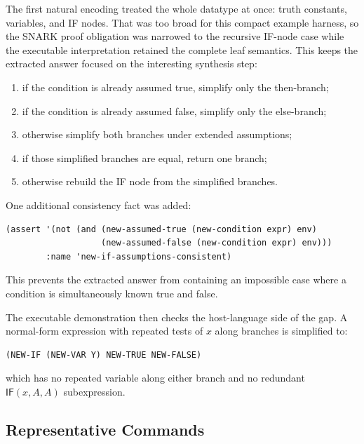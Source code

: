 \documentclass[runningheads]{llncs}
\begin{document}
The first natural encoding treated the whole datatype at once: truth constants,
variables, and IF nodes.  That was too broad for this compact example harness,
so the SNARK proof obligation was narrowed to the recursive IF-node case while
the executable interpretation retained the complete leaf semantics.  This keeps
the extracted answer focused on the interesting synthesis step:
\begin{enumerate}
\item if the condition is already assumed true, simplify only the then-branch;
\item if the condition is already assumed false, simplify only the else-branch;
\item otherwise simplify both branches under extended assumptions;
\item if those simplified branches are equal, return one branch;
\item otherwise rebuild the IF node from the simplified branches.
\end{enumerate}

One additional consistency fact was added:
\begin{lstlisting}
(assert '(not (and (new-assumed-true (new-condition expr) env)
                   (new-assumed-false (new-condition expr) env)))
        :name 'new-if-assumptions-consistent)
\end{lstlisting}
This prevents the extracted answer from containing an impossible case where a
condition is simultaneously known true and false.

The executable demonstration then checks the host-language side of the gap.  A
normal-form expression with repeated tests of \(x\) along branches is simplified
to:
\begin{lstlisting}
(NEW-IF (NEW-VAR Y) NEW-TRUE NEW-FALSE)
\end{lstlisting}
which has no repeated variable along either branch and no redundant
\(\mathsf{IF}(x,A,A)\) subexpression.

\subsection{Representative Commands}
\end{document}
